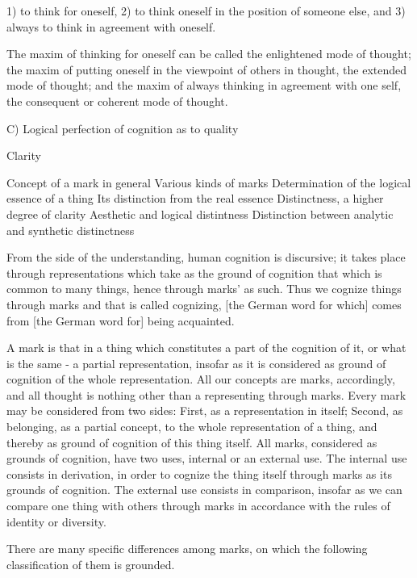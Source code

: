     1) to think for oneself,
    2) to think oneself in the position of someone else, and
    3) always to think in agreement with oneself.

    The maxim of thinking for oneself can be called
    the enlightened mode of thought;
    the maxim of putting oneself in the viewpoint of others in thought,
    the extended mode of thought;
    and the maxim of always thinking in agreement with one self,
    the consequent or coherent mode of thought.

    C) Logical perfection of cognition as to quality

    Clarity

        Concept of a mark in general
        Various kinds of marks
        Determination of the logical essence of a thing
        Its distinction from the real essence
        Distinctness, a higher degree of clarity
        Aesthetic and logical distintness
        Distinction between analytic and synthetic distinctness

    From the side of the understanding,
    human cognition is discursive;
    it takes place through representations
    which take as the ground of cognition
    that which is common to many things,
    hence through marks' as such.
    Thus we cognize things through marks
    and that is called cognizing,
    [the German word for which] comes from
    [the German word for] being acquainted.

    A mark is that in a thing which constitutes
    a part of the cognition of it, or
    what is the same - a partial representation,
    insofar as it is considered as
    ground of cognition of the whole representation.
    All our concepts are marks, accordingly, and
    all thought is nothing other than a representing through marks.
    Every mark may be considered from two sides:
    First, as a representation in itself;
    Second, as belonging, as a partial concept, to
    the whole representation of a thing, and thereby
    as ground of cognition of this thing itself.
    All marks, considered as grounds of cognition, have two uses,
    internal or an external use.
    The internal use consists in derivation,
    in order to cognize the thing itself
    through marks as its grounds of cognition.
    The external use consists in comparison,
    insofar as we can compare one thing with others
    through marks in accordance with the rules of
    identity or diversity.

    There are many specific differences among marks,
    on which the following classification of them is grounded.

